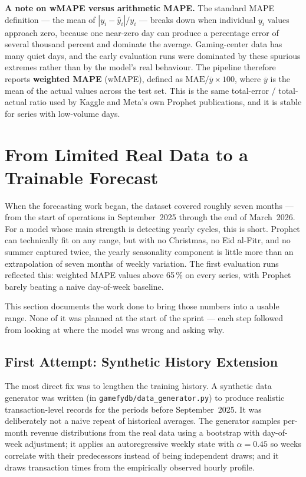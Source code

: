 \medskip
\noindent\textbf{A note on wMAPE versus arithmetic MAPE.}
The standard MAPE definition --- the mean of $|y_i - \hat{y}_i| / y_i$ --- breaks down
when individual $y_i$ values approach zero, because one near-zero day can produce a
percentage error of several thousand percent and dominate the average. Gaming-center
data has many quiet days, and the early evaluation runs were dominated by these
spurious extremes rather than by the model's real behaviour. The pipeline therefore
reports \textbf{weighted MAPE} (wMAPE), defined as $\text{MAE} / \overline{y} \times 100$,
where $\overline{y}$ is the mean of the actual values across the test set. This is
the same total-error / total-actual ratio used by Kaggle and Meta's own Prophet
publications, and it is stable for series with low-volume days.

\section{From Limited Real Data to a Trainable Forecast}\label{sec:data_journey}

When the forecasting work began, the dataset covered roughly seven months ---
from the start of operations in September~2025 through the end of March~2026.
For a model whose main strength is detecting yearly cycles, this is short.
Prophet can technically fit on any range, but with no Christmas, no Eid al-Fitr,
and no summer captured twice, the yearly seasonality component is little more
than an extrapolation of seven months of weekly variation. The first evaluation
runs reflected this: weighted MAPE values above 65\,\% on every series, with
Prophet barely beating a naive day-of-week baseline.

This section documents the work done to bring those numbers into a usable
range. None of it was planned at the start of the sprint --- each step
followed from looking at where the model was wrong and asking why.

\subsection{First Attempt: Synthetic History Extension}

The most direct fix was to lengthen the training history. A synthetic data
generator was written (in \texttt{gamefydb/data\_generator.py}) to produce
realistic transaction-level records for the periods before September~2025.
It was deliberately not a naive repeat of historical averages. The generator
samples per-month revenue distributions from the real data using a bootstrap
with day-of-week adjustment; it applies an autoregressive weekly state with
$\alpha=0.45$ so weeks correlate with their predecessors instead of being
independent draws; and it draws transaction times from the empirically observed
hourly profile.

